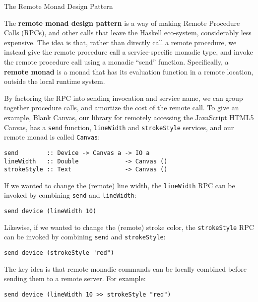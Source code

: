 \begin{hcarentry}[new]{The Remote Monad Design Pattern}
\label{RemoteMonad}
\makeheader

The {\bf remote monad design pattern} is a way of making Remote Procedure
Calls (RPCs), and other calls that leave the Haskell eco-system, considerably
less expensive.  The idea is that, rather than directly call a remote
procedure, we instead give the remote procedure call a service-specific
monadic type, and invoke the remote procedure call using a monadic ``send''
function.  Specifically, a {\bf remote monad} is a monad that has its
evaluation function in a remote location, outside the local runtime system.

By factoring the RPC into sending invocation and service name, we can
group together procedure calls, and amortize the cost of the remote
call. To give an example, Blank Canvas, our library for remotely
accessing the JavaScript HTML5 Canvas, has a \verb|send| function,
\verb`lineWidth` and \verb`strokeStyle` services, and our remote monad is called
\verb`Canvas`:

{\footnotesize
\begin{verbatim}
send        :: Device -> Canvas a -> IO a
lineWidth   :: Double             -> Canvas ()
strokeStyle :: Text               -> Canvas ()
\end{verbatim}
}

If we wanted to change the (remote) line width,
the \verb`lineWidth` RPC can be invoked by combining \verb`send`
and \verb`lineWidth`:

{\footnotesize
\begin{verbatim}
send device (lineWidth 10)
\end{verbatim}
}

Likewise, if we wanted to change the (remote) stroke color,
the \verb`strokeStyle` RPC can be invoked by combining \verb`send`
and \verb`strokeStyle`:

{\footnotesize
\begin{verbatim}
send device (strokeStyle "red")
\end{verbatim}
}

The key idea is that remote monadic commands can
be locally combined before sending them to a remote server.
For example:

{\footnotesize
\begin{verbatim}
send device (lineWidth 10 >> strokeStyle "red")
\end{verbatim}
}


\end{hcarentry}
